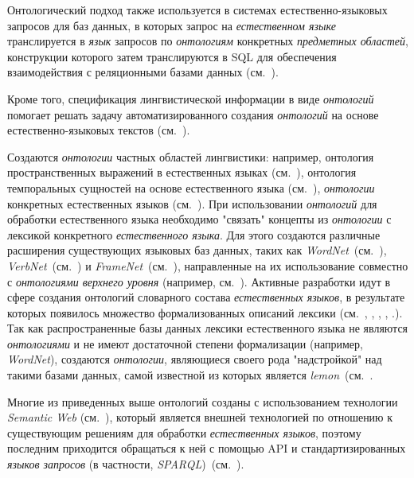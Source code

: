 Онтологический подход также используется в системах естественно-языковых запросов для баз данных, в которых запрос на \textit{естественном языке} транслируется в \textit{язык} запросов по \textit{онтологиям} конкретных \textit{предметных областей}, конструкции которого затем транслируются в SQL для обеспечения взаимодействия с реляционными базами данных (см.~).

Кроме того, спецификация лингвистической информации в виде \textit{онтологий} помогает решать задачу автоматизированного создания \textit{онтологий} на основе естественно-языковых текстов (см.~).

Создаются \textit{онтологии} частных областей лингвистики: например, онтология пространственных выражений в естественных языках (см.~), онтология темпоральных сущностей на основе естественного языка (см.~), \textit{онтологии} конкретных естественных языков (см.~).
При использовании \textit{онтологий} для обработки естественного языка необходимо "связать"{} концепты из \textit{онтологии} с лексикой конкретного \textit{естественного языка}.
Для этого создаются различные расширения существующих языковых баз данных, таких как \textit{WordNet}~(см.~), \textit{VerbNet}~(см.~) и \textit{FrameNet}~(см.~), направленные на их использование совместно с \textit{онтологиями верхнего уровня} (например, см.~).
Активные разработки идут в сфере создания онтологий словарного состава \textit{естественных языков}, в результате которых появилось множество формализованных описаний лексики (см.~, , , , .).
Так как распространенные базы данных лексики естественного языка не являются \textit{онтологиями} и не имеют достаточной степени формализации (например, \textit{WordNet}), создаются \textit{онтологии}, являющиеся своего рода "надстройкой"{} над такими базами данных, самой известной из которых является \textit{lemon}~(см.~.

Многие из приведенных выше онтологий созданы с использованием технологии \textit{Semantic Web} (см.~), который является внешней технологией по отношению к существующим решениям для обработки \textit{естественных языков}, поэтому последним приходится обращаться к ней с помощью API и стандартизированных \textit{языков запросов} (в частности, \textit{SPARQL})~(см.~).

